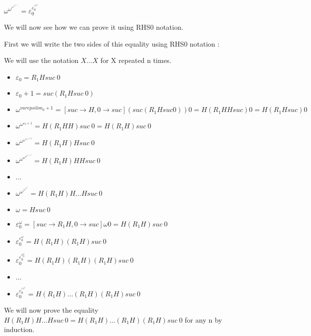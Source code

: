 \documentclass[10pt]{article}
\begin{document}
 \( \omega^{\omega^{\vdots^{\omega^{\omega^{\varepsilon_0+1}}}}} = \varepsilon_0^{\varepsilon_0^{\vdots^{{\varepsilon_0}^\omega}}} \)

We will now see how we can prove it using RHS0 notation.

First we will write the two sides of this equality using RHS0 notation :

We will use the notation \( X \ldots X \) for X repeated n times.

\begin{itemize}
     \setlength{\itemsep}{1pt}
     \setlength{\parskip}{0pt}
     \setlength{\parsep}{0pt}
\item \( \varepsilon_0 = R_1 H suc\ 0 \)
\item \( \varepsilon_0 + 1 = suc (R_1 H suc\ 0) \)
\item \( \omega^{varepsilon_0+1} = [suc \rightarrow H, 0 \rightarrow suc] (suc (R_1 H suc 0)) 0 = H (R_1 H H suc) 0 = H (R_1 H suc) 0 \)
\item \( \omega^{\omega^{\varepsilon_0+1}} = H (R_1 H H) suc\ 0 = H (R_1 H) suc\ 0 \)
\item \( \omega^{\omega^{\omega^{\varepsilon_0+1}}} = H (R_1 H) H suc\ 0 \)
\item \( \omega^{\omega^{\omega^{\omega^{\varepsilon_0+1}}}} = H (R_1 H) H H suc\ 0 \)
\item \( \ldots \)
\item \( \omega^{\omega^{\vdots^{\omega^{\omega^{\varepsilon_0}}}}} = H (R_1 H) H \ldots H suc\ 0 \)
\end{itemize}

\begin{itemize}
     \setlength{\itemsep}{1pt}
     \setlength{\parskip}{0pt}
     \setlength{\parsep}{0pt}
\item \( \omega = H suc\ 0 \)
\item \( \varepsilon_0^\omega = [suc \rightarrow R_1 H, 0 \rightarrow suc] \omega 0 = H (R_1 H) suc\ 0 \)
\item \( \varepsilon_0^{\varepsilon_0^\omega} = H (R_1 H) (R_1 H) suc\ 0 \)
\item \( \varepsilon_0^{\varepsilon_0^{\varepsilon_0^\omega}} = H (R_1 H) (R_1 H) (R_1 H) suc\ 0 \)
\item \( \ldots \)
\item \( \varepsilon_0^{\varepsilon_0^{\vdots^{{\varepsilon_0}^\omega}}} = H (R_1 H) \ldots (R_1 H) (R_1 H) suc\ 0 \)
\end{itemize}

We will now prove the equality \( H (R_1 H) H \ldots H suc\ 0 = H (R_1 H) \ldots (R_1 H) (R_1 H) suc\ 0 \) for any n by induction.
\end{document}
